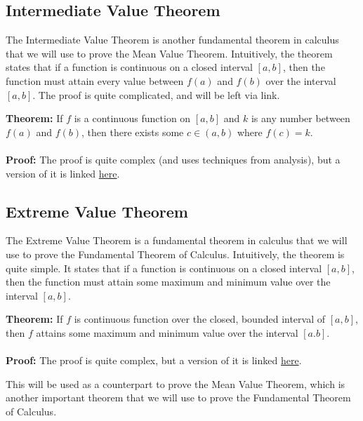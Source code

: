 \subsection{Intermediate Value Theorem}
The Intermediate Value Theorem is another fundamental theorem in calculus that we will use to prove the Mean Value Theorem. Intuitively, the theorem states that if a function is continuous on a closed interval $[a,b]$, then the function must attain every value between $f(a)$ and $f(b)$ over the interval $[a,b]$. The proof is quite complicated, and will be left via link.
\begin{boxedsection}
  \textbf{Theorem:} If $f$ is a continuous function on $[a,b]$ and $k$ is any number between $f(a)$ and $f(b)$, then there exists some $c \in (a,b)$ where $f(c) = k$.\\
  \\
  \textbf{Proof:} The proof is quite complex (and uses techniques from analysis), but a version of it is linked \href{https://math.oxford.emory.edu/site/math111/proofs/ivt/}{here}. 
\end{boxedsection}
\subsection{Extreme Value Theorem}
The Extreme Value Theorem is a fundamental theorem in calculus that we will use to prove the Fundamental Theorem of Calculus.
Intuitively, the theorem is quite simple. It states that if a function is continuous on a closed interval $[a,b]$, then the function must attain some maximum and minimum value over the interval $[a,b]$.
\begin{boxedsection}
  \textbf{Theorem:} If $f$ is continuous function over the closed, bounded interval of $[a,b]$, then $f$ attains some maximum and minimum value over the interval $[a.b]$.\\
  \\
  \textbf{Proof:} The proof is quite complex, but a version of it is linked \href{https://mathcenter.oxford.emory.edu/site/math111/proofs/extremeValueTheorem/}{here}.
\end{boxedsection}
This will be used as a counterpart to prove the Mean Value Theorem, which is another important theorem that we will use to prove the Fundamental Theorem of Calculus.

